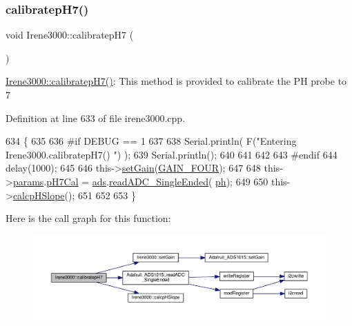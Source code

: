\subsubsection{\texorpdfstring{calibratep\+H7()}{calibratepH7()}}
{\footnotesize\ttfamily void Irene3000\+::calibratep\+H7 (\begin{DoxyParamCaption}{ }\end{DoxyParamCaption})}

\hyperlink{class_irene3000_a1d3299202e4cb7afcff9c9e3e95d94c1}{Irene3000\+::calibratep\+H7()}\+: This method is provided to calibrate the PH probe to 7 

Definition at line 633 of file irene3000.\+cpp.


\begin{DoxyCode}
634 \{
635 
636 \textcolor{preprocessor}{#if DEBUG == 1 }
637 
638     Serial.println( F(\textcolor{stringliteral}{"Entering Irene3000.calibratepH7() "}) );
639     Serial.println();
640     
641     
642 
643 \textcolor{preprocessor}{#endif }
644     delay(1000);
645 
646     this->\hyperlink{class_irene3000_aff7c5da186b388e7272e63ff88a20c34}{setGain}(\hyperlink{_cool_adafruit___a_d_s1015_8h_a3d6c0e15829a207b9155890811fa4781a33fa5521f4e806b7438052fcdbbf8660}{GAIN\_FOUR});
647         
648     this->\hyperlink{class_irene3000_a136585a5ee7f9ac6ab52175fa153f8e3}{params}.\hyperlink{struct_irene3000_1_1parameters___t_a21265466a570d84bff914f26d2f7a03e}{pH7Cal} = \hyperlink{class_irene3000_a1215e77ba761c9908d80d691f149e135}{ads}.\hyperlink{class_adafruit___a_d_s1015_a40f38b9e1f3ec397c0670dd632510235}{readADC\_SingleEnded}(
      \hyperlink{_irene3000_8h_af771ceafe0e6524dd8497d4305dfe778}{ph});
649  
650     this->\hyperlink{class_irene3000_a81f6a79e546679692053f7ac1af49613}{calcpHSlope}();
651 
652 
653 \}
\end{DoxyCode}
Here is the call graph for this function\+:\nopagebreak
\begin{figure}[H]
\begin{center}
\leavevmode
\includegraphics[width=350pt]{d6/d03/class_irene3000_a1d3299202e4cb7afcff9c9e3e95d94c1_cgraph}
\end{center}
\end{figure}
